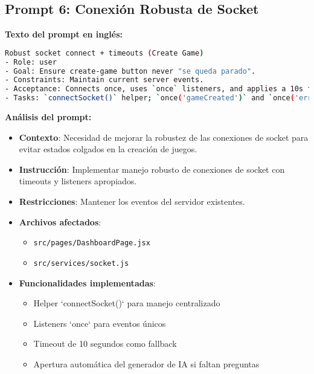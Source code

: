 \documentclass[12pt,a4paper]{article}
\begin{document}
\subsection{Prompt 6: Conexión Robusta de Socket}

\textbf{Texto del prompt en inglés:}
\begin{lstlisting}[language=bash]
Robust socket connect + timeouts (Create Game)
- Role: user
- Goal: Ensure create-game button never "se queda parado".
- Constraints: Maintain current server events.
- Acceptance: Connects once, uses `once` listeners, and applies a 10s fallback timeout; opens AI generator if missing questions.
- Tasks: `connectSocket()` helper; `once('gameCreated')` and `once('error')`; timeout clearing.
\end{lstlisting}

\textbf{Análisis del prompt:}
\begin{itemize}
    \item \textbf{Contexto}: Necesidad de mejorar la robustez de las conexiones de socket para evitar estados colgados en la creación de juegos.
    
    \item \textbf{Instrucción}: Implementar manejo robusto de conexiones de socket con timeouts y listeners apropiados.
    
    \item \textbf{Restricciones}: Mantener los eventos del servidor existentes.
    
    \item \textbf{Archivos afectados}:
    \begin{itemize}
        \item \texttt{src/pages/DashboardPage.jsx}
        \item \texttt{src/services/socket.js}
    \end{itemize}
    
    \item \textbf{Funcionalidades implementadas}:
    \begin{itemize}
        \item Helper `connectSocket()` para manejo centralizado
        \item Listeners `once` para eventos únicos
        \item Timeout de 10 segundos como fallback
        \item Apertura automática del generador de IA si faltan preguntas
    \end{itemize}
\end{itemize}
\end{document}
